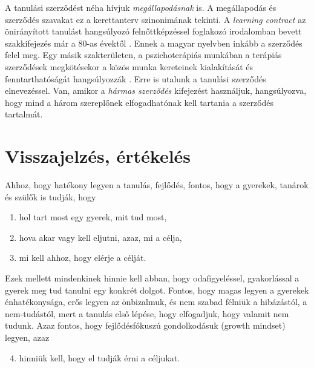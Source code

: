 A tanulási szerződést néha hívjuk \emph{megállapodásnak} is. A megállapodás és
szerződés szavakat ez a kerettanterv szinonimának tekinti. A \emph{learn\-ing
      con\-tract} az önirányított tanulást hangsúlyozó felnőttképzéssel
foglakozó
irodalomban
bevett szakkifejezés már a 80-as évektől \citep{Malcolm77}. Ennek a magyar
nyelvben inkább a szerződés felel meg. Egy másik szakterületen, a
pszichoterápiás munkában a terápiás szerződések megkötésekor a közös munka
kereteinek kialakítását és fenntarthatóságát hangsúlyozzák
\citep{pszichoterapia}. Erre is utalunk a tanulási szerződés elnevezéssel. Van,
amikor a \emph{hármas szerződés} kifejezést használjuk, hangsúlyozva, hogy mind
a három szereplőnek elfogadhatónak kell tartania a szerződés tartalmát.

\section{Visszajelzés, értékelés}
\label{sec:ertekeles}
Ahhoz, hogy hatékony legyen a tanulás, fejlődés, fontos, hogy a gyerekek,
tanárok és szülők is tudják, hogy
\begin{enumerate}
      \item hol tart most egy gyerek, mit tud most,
      \item hova akar vagy kell eljutni, azaz, mi a célja,
      \item mi kell ahhoz, hogy elérje a célját.
\end{enumerate}
Ezek mellett mindenkinek hinnie kell abban, hogy odafigyeléssel, gyakorlással a
gyerek meg tud tanulni egy konkrét dolgot. Fontos, hogy magas legyen a gyerekek
énhatékonysága,  erős legyen az önbizalmuk, és nem szabad félniük a hibázástól,
a nem-tudástól,
mert a tanulás első lépése, hogy elfogadjuk, hogy valamit nem tudunk. Azaz
fontos, hogy fejlődésfókuszú gondolkodásuk (growth mindset)
\citep{growthmindset} legyen, azaz
\begin{enumerate}
      \setcounter{enumi}{3}
      \item hinniük kell, hogy el tudják érni a céljukat.
\end{enumerate}

